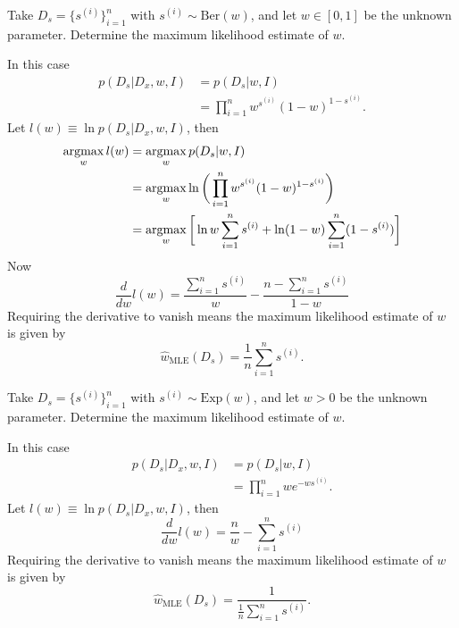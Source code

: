 \begin{example}
	Take $D_s= \{s^{(i)}\}_{i=1}^n$ with $s^{(i)}\sim \mathrm{Ber}(w)$, and let $w\in [0,1]$ be the unknown parameter. Determine the maximum likelihood estimate of $w$.\newline
	
	\noindent In this case
	\begin{equation}
		\begin{split}
			p(D_s|D_x,w,I) & =p(D_s|w,I)\\
			& = \prod_{i=1}^nw^{s^{(i)}}(1-w)^{1-s^{(i)}}.
		\end{split}
	\end{equation}
	Let $l(w)\equiv \ln p(D_s|D_x,w,I)$, then
	\begin{equation}
		\begin{split}
			\operatorname*{argmax}_wl(w) & = \operatorname*{argmax}_wp(D_s|w,I)\\
			&= \operatorname*{argmax}_w\ln \bigg(\prod_{i=1}^nw^{s^{(i)}}(1-w)^{1-s^{(i)}}\bigg)\\
			&=\operatorname*{argmax}_w \bigg[\ln w\sum_{i=1}^ns^{(i)} + \ln(1-w)\sum_{i=1}^n(1-s^{(i)})\bigg]
		\end{split}
	\end{equation}
	Now 
	\begin{equation}
		\frac{d}{dw}l(w)=\frac{\sum_{i=1}^ns^{(i)}}{w}-\frac{n-\sum_{i=1}^ns^{(i)}}{1-w}
	\end{equation}
	Requiring the derivative to vanish means the maximum likelihood estimate of $w$ is given by
	\begin{equation}
		\hat{w}_{\text{MLE}}(D_s)=\frac{1}{n}\sum_{i=1}^ns^{(i)}.
	\end{equation}
\end{example}
\begin{example}
	Take $D_s= \{s^{(i)}\}_{i=1}^n$ with $s^{(i)}\sim \mathrm{Exp}(w)$, and let $w> 0$ be the unknown parameter. Determine the maximum likelihood estimate of $w$.\newline
	
	\noindent In this case
	\begin{equation}
		\begin{split}
			p(D_s|D_x,w,I)& =p(D_s|w,I)\\
			& =\prod_{i=1}^nw e^{-w s^{(i)}}.
		\end{split}
	\end{equation}
	Let $l(w)\equiv \ln p(D_s|D_x,w,I)$, then
	\begin{equation}
		\frac{d}{dw}l(w)=\frac{n}{w}-\sum_{i=1}^ns^{(i)}
	\end{equation}
	Requiring the derivative to vanish means the maximum likelihood estimate of $w$ is given by
	\begin{equation}
		\hat{w}_{\text{MLE}}(D_s)=\frac{1}{\frac{1}{n}\sum_{i=1}^ns^{(i)}}.
	\end{equation}
\end{example}

